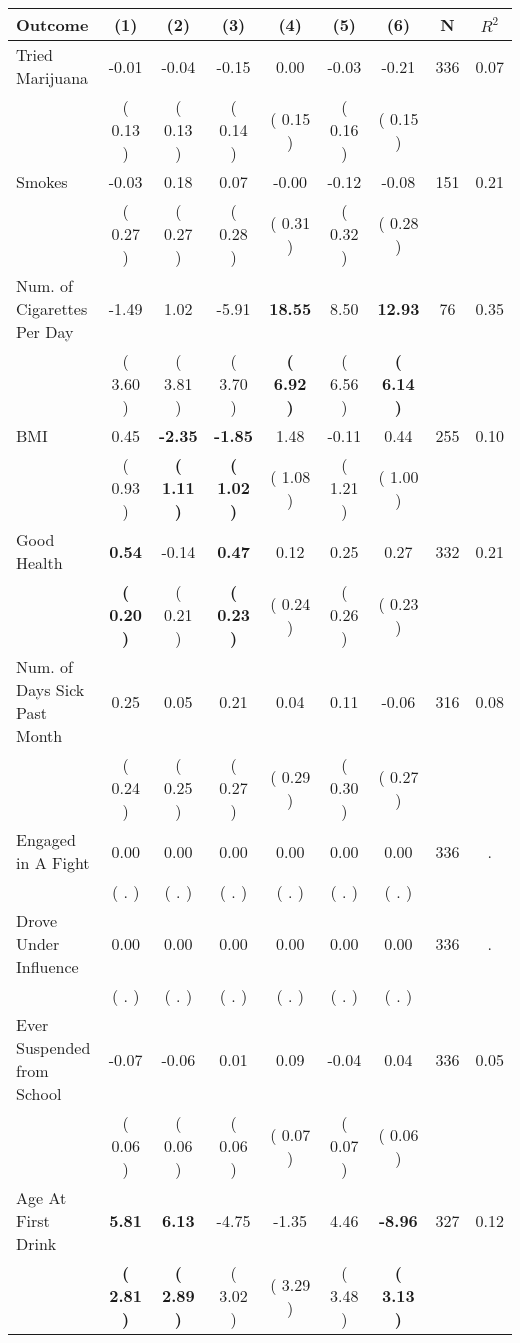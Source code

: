 \begin{tabular}{lcccccccc}
\toprule
 \textbf{Outcome} & \textbf{(1)} & \textbf{(2)} & \textbf{(3)} & \textbf{(4)} & \textbf{(5)} & \textbf{(6)} & \textbf{N} & \textbf{$ R^2$} \\
\midrule
Tried Marijuana &     -0.01 &     -0.04 &     -0.15 &      0.00 &     -0.03 &     -0.21 & 336 &       0.07 \\ 
 & (     0.13 ) & (     0.13 ) & (     0.14 ) & (     0.15 ) & (     0.16 ) & (     0.15 ) & \\
Smokes &     -0.03 &      0.18 &      0.07 &     -0.00 &     -0.12 &     -0.08 & 151 &       0.21 \\ 
 & (     0.27 ) & (     0.27 ) & (     0.28 ) & (     0.31 ) & (     0.32 ) & (     0.28 ) & \\
Num. of Cigarettes Per Day &     -1.49 &      1.02 &     -5.91 & \textbf{    18.55} &      8.50 & \textbf{    12.93} & 76 &       0.35 \\ 
 & (     3.60 ) & (     3.81 ) & (     3.70 ) & \textbf{(     6.92 )} & (     6.56 ) & \textbf{(     6.14 )} & \\
BMI &      0.45 & \textbf{    -2.35} & \textbf{    -1.85} &      1.48 &     -0.11 &      0.44 & 255 &       0.10 \\ 
 & (     0.93 ) & \textbf{(     1.11 )} & \textbf{(     1.02 )} & (     1.08 ) & (     1.21 ) & (     1.00 ) & \\
Good Health & \textbf{     0.54} &     -0.14 & \textbf{     0.47} &      0.12 &      0.25 &      0.27 & 332 &       0.21 \\ 
 & \textbf{(     0.20 )} & (     0.21 ) & \textbf{(     0.23 )} & (     0.24 ) & (     0.26 ) & (     0.23 ) & \\
Num. of Days Sick Past Month &      0.25 &      0.05 &      0.21 &      0.04 &      0.11 &     -0.06 & 316 &       0.08 \\ 
 & (     0.24 ) & (     0.25 ) & (     0.27 ) & (     0.29 ) & (     0.30 ) & (     0.27 ) & \\
Engaged in A Fight &      0.00 &      0.00 &      0.00 &      0.00 &      0.00 &      0.00 & 336 &          . \\ 
 & (        . ) & (        . ) & (        . ) & (        . ) & (        . ) & (        . ) & \\
Drove Under Influence &      0.00 &      0.00 &      0.00 &      0.00 &      0.00 &      0.00 & 336 &          . \\ 
 & (        . ) & (        . ) & (        . ) & (        . ) & (        . ) & (        . ) & \\
Ever Suspended from School &     -0.07 &     -0.06 &      0.01 &      0.09 &     -0.04 &      0.04 & 336 &       0.05 \\ 
 & (     0.06 ) & (     0.06 ) & (     0.06 ) & (     0.07 ) & (     0.07 ) & (     0.06 ) & \\
Age At First Drink & \textbf{     5.81} & \textbf{     6.13} &     -4.75 &     -1.35 &      4.46 & \textbf{    -8.96} & 327 &       0.12 \\ 
 & \textbf{(     2.81 )} & \textbf{(     2.89 )} & (     3.02 ) & (     3.29 ) & (     3.48 ) & \textbf{(     3.13 )} & \\
\bottomrule
\end{tabular}
